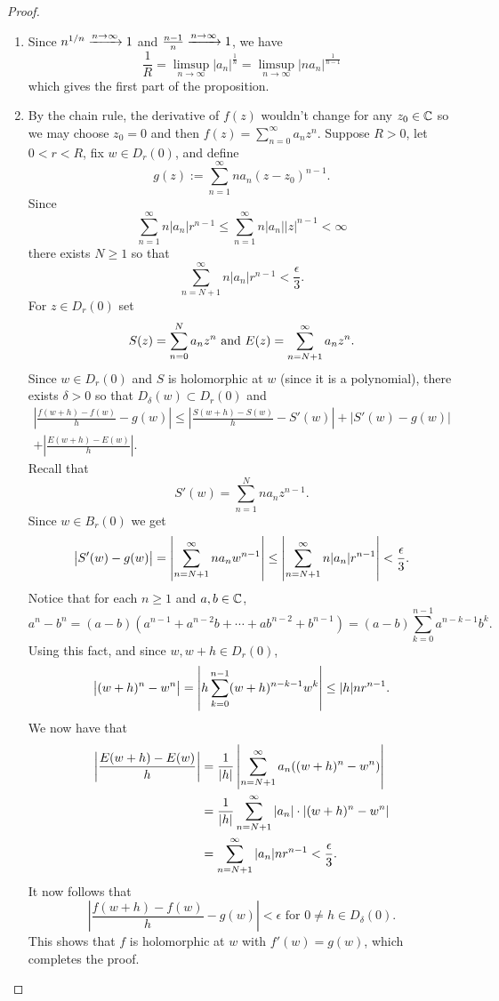 \documentclass[11pt,a4paper]{article}
\begin{document}
\begin{proof} \phantom{}
\begin{enumerate}
  \item[(1)]
    Since $n^{1/n} \xrightarrow{n \to \infty} 1$ and
    $\frac{n-1}{n} \xrightarrow{n \to \infty} 1$, we have
    \[
      \frac{1}{R} =
      \limsup_{n \to \infty} |a_n|^{\frac{1}{n}} =
      \limsup_{n \to \infty} |n a_n|^{\frac{1}{n - 1}}
    \]
    which gives the first part of the proposition.
  \item[(2)] By the chain rule, the derivative of $f(z)$ wouldn't change
    for any $z_0 \in \mathbb{C}$ so we may choose $z_0 = 0$ and then
    $f(z) = \sum_{n=0}^{\infty} a_n z^n$.
    Suppose $R > 0$, let $0 < r < R$, fix $w \in D_r(0)$, and define
    \[
      g(z) := \sum_{n=1}^{\infty} n a_n (z - z_0)^{n - 1}.
    \]
    Since
    \[
      \sum_{n=1}^{\infty} n |a_n| r^{n - 1} \le
      \sum_{n=1}^{\infty} n |a_n| |z|^{n - 1} < \infty
    \]
    there exists $N \geq 1$ so that
    \[
      \sum_{n=N+1}^{\infty} n |a_n| r^{n - 1} < \frac{\epsilon}{3}.
    \]
    For $z \in D_r(0)$ set
    \[
      S(z) = \sum_{n=0}^{N} a_n z^n \text{ and }
      E(z) = \sum_{n=N+1}^{\infty} a_n z^n.
    \]
    Since $w \in D_r(0)$ and $S$ is holomorphic at $w$ 
    (since it is a polynomial), there exists $\delta > 0$ so that
    $D_{\delta}(w) \subset D_r(0)$ and
    \begin{multline*}
      \left|
      \frac{f(w + h) - f(w)}{h} - g(w)
      \right| \le
      \left|
      \frac{S(w + h) - S(w)}{h} - S'(w)
      \right| +
      \left| S'(w) - g(w) \right| \\ +
      \left|
      \frac{E(w + h) - E(w)}{h}
      \right|.
    \end{multline*}
    Recall that
    \[
      S'(w) = \sum_{n=1}^{N} n a_n z^{n - 1}.
    \]
    Since $w \in B_r(0)$ we get
    \[
      \left\lvert S'(w) - g(w)\right\rvert =
      \left\lvert\sum_{n=N+1}^{\infty} n a_n w^{n - 1}\right\rvert \le
      \left\lvert\sum_{n=N+1}^{\infty} n |a_n| r^{n - 1}\right\rvert <
      \frac{\epsilon}{3}.
    \]
    Notice that for each $n \geq 1$ and $a,b \in \mathbb{C}$,
    \[
      a^n - b^n =
      (a - b)(a^{n - 1} + a^{n - 2} b + \cdots + a b^{n-2} + b^{n-1}) =
      (a - b) \sum_{k=0}^{n-1} a^{n-k-1} b^{k}.
    \]
    Using this fact, and since $w,w+h \in D_r(0)$,
    \[
      \left\lvert(w + h)^n - w^n\right\rvert =
      \left\lvert h \sum_{k=0}^{n-1} (w + h)^{n-k-1} w^{k}\right\rvert \le
      |h| n r^{n-1}.
    \]
    We now have that
    \begin{align*}
      \left\lvert\frac{E(w + h) - E(w)}{h}\right\rvert 
        &= \frac{1}{|h|} \left\lvert\sum_{n=N+1}^{\infty} a_n((w+h)^{n}-w^n)\right\rvert \\
        &= \frac{1}{|h|} \sum_{n=N+1}^{\infty} |a_n| \cdot |(w+h)^{n}-w^n| \\
        &= \sum_{n=N+1}^{\infty} |a_n| n r^{n-1} < \frac{\epsilon}{3}.
    \end{align*}
    It now follows that
    \[
      \left|
      \frac{f(w + h) - f(w)}{h} - g(w)
      \right| < \epsilon \text{ for } 0 \neq h \in D_{\delta}(0).
    \]
    This shows that $f$ is holomorphic at $w$ with $f'(w) = g(w)$, which
    completes the proof.
\end{enumerate}
\end{proof}
\end{document}
